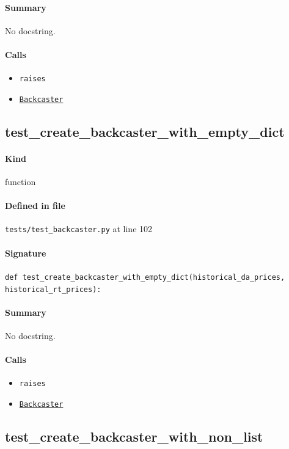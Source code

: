 \documentclass[11pt]{report}
\begin{document}
\paragraph{Summary} No docstring.
\paragraph{Calls}
\begin{itemize}[leftmargin=*]
  \item \texttt{raises}
  \item \hyperref[def:forecaster.py:Backcaster:L321]{\texttt{Backcaster}}
\end{itemize}
\subsection{test\_create\_backcaster\_with\_empty\_dict}
\label{def:tests-test_backcaster.py:test_create_backcaster_with_empty_dict:L102}
\paragraph{Kind} function
\paragraph{Defined in file} \texttt{tests/test\_backcaster.py} at line 102
\paragraph{Signature} \texttt{def test\_create\_backcaster\_with\_empty\_dict(historical\_da\_prices, historical\_rt\_prices):}
\paragraph{Summary} No docstring.
\paragraph{Calls}
\begin{itemize}[leftmargin=*]
  \item \texttt{raises}
  \item \hyperref[def:forecaster.py:Backcaster:L321]{\texttt{Backcaster}}
\end{itemize}
\subsection{test\_create\_backcaster\_with\_non\_list}
\label{def:tests-test_backcaster.py:test_create_backcaster_with_non_list:L109}
\end{document}
